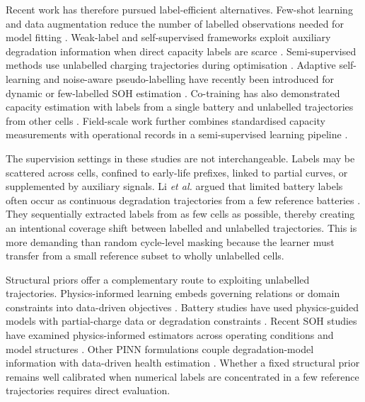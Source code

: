 \documentclass[pdflatex,sn-mathphys-num]{sn-jnl}
\begin{document}
Recent work has therefore pursued label-efficient alternatives. Few-shot learning and data augmentation reduce the number of labelled observations needed for model fitting \cite{zhang2023fewshot,han2024limited}. Weak-label and self-supervised frameworks exploit auxiliary degradation information when direct capacity labels are scarce \cite{wang2024weaklabels,qian2026minimal}. Semi-supervised methods use unlabelled charging trajectories during optimisation \cite{lin2023improving,salucci2023novel}. Adaptive self-learning and noise-aware pseudo-labelling have recently been introduced for dynamic or few-labelled SOH estimation \cite{jiang2024adaptive,zhang2025selftransformer}. Co-training has also demonstrated capacity estimation with labels from a single battery and unlabelled trajectories from other cells \cite{qu2025cotrain}. Field-scale work further combines standardised capacity measurements with operational records in a semi-supervised learning pipeline \cite{hadzalic2025field}.

The supervision settings in these studies are not interchangeable. Labels may be scattered across cells, confined to early-life prefixes, linked to partial curves, or supplemented by auxiliary signals. Li \textit{et al.} argued that limited battery labels often occur as continuous degradation trajectories from a few reference batteries \cite{li2026auxiliary}. They sequentially extracted labels from as few cells as possible, thereby creating an intentional coverage shift between labelled and unlabelled trajectories. This is more demanding than random cycle-level masking because the learner must transfer from a small reference subset to wholly unlabelled cells.

Structural priors offer a complementary route to exploiting unlabelled trajectories. Physics-informed learning embeds governing relations or domain constraints into data-driven objectives \cite{raissi2019physics,karniadakis2021physics}. Battery studies have used physics-guided models with partial-charge data or degradation constraints \cite{kohtz2022physics,wang2024physics}. Recent SOH studies have examined physics-informed estimators across operating conditions and model structures \cite{ye2024method,lin2025physics}. Other PINN formulations couple degradation-model information with data-driven health estimation \cite{tian2025generic,wen2023physics}. Whether a fixed structural prior remains well calibrated when numerical labels are concentrated in a few reference trajectories requires direct evaluation.
\end{document}
